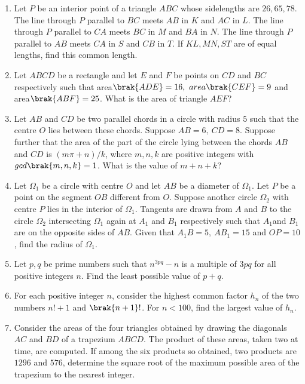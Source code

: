 \documentclass{article}
\begin{document}
\begin{enumerate}
\item Let $P$ be an interior point of a triangle $ABC$ whose sidelengths are $26, 65, 78$. The line through $P$ parallel to $BC$ meets $AB$ in $K$ and $AC$ in $L$. The line through $P$ parallel to $CA$ meets $BC$ in $M$ and $BA$ in $N$. The line through $P$ parallel to $AB$ meets $CA$ in $S$ and $CB$ in $T$. If $KL, MN, ST$ are of equal lengths, find this common length.
\item Let $ABCD$ be a rectangle and let $E$ and $F$ be points on $CD$ and $BC$ respectively such that area$\brak{ADE} = 16,\ area\brak{CEF}=9$ and area$\brak{ABF} = 25$. What is the area of triangle $AEF$?
\item Let $AB$ and $CD$ be two parallel chords in a circle with radius $5$ such that the centre $O$ lies between these chords. Suppose $AB = 6,\ CD = 8$. Suppose further that the area of the part of the circle lying between the chords $AB$ and $CD$ is $(m\pi+n)/k$, where $m, n, k$ are positive integers with $gcd\brak{m, n, k}=1$. What is the value of $m + n + k$?
\item Let $\Omega_1$ be a circle with centre $O$ and let $AB$ be a diameter of $\Omega_1$. Let $P$ be a point on the segment $OB$ different from $O$. Suppose another circle $\Omega_2$ with centre $P$ lies in the interior of $\Omega_1$. Tangents are drawn from $A$ and $B$ to the circle $\Omega_2$ intersecting $\Omega_1$ again at $A_1$ and $B_1$ respectively such that $A_1$and $B_1$ are on the opposite sides of $AB$. Given that $A_1B = 5,\ AB_1 = 15$ and $OP = 10$, find the radius of $\Omega_1$.
\item Let $p, q$ be prime numbers such that $n^{3pq}-n$ is a multiple of $3pq$ for all positive integers $n$. Find the least possible value of $p + q$.
\item For each positive integer $n$, consider the highest common factor $h_n$ of the two numbers $n!+1$ and $\brak{n + 1}!$. For $n < 100$, find the largest value of $h_n$.
\item Consider the areas of the four triangles obtained by drawing the diagonals $AC$ and $BD$ of a trapezium $ABCD$. The product of these areas, taken two at time, are computed. If among the six products so obtained, two products are $1296$ and $576$, determine the square root of the maximum possible area of the trapezium to the nearest integer. 

\end{enumerate}
\end{document}
